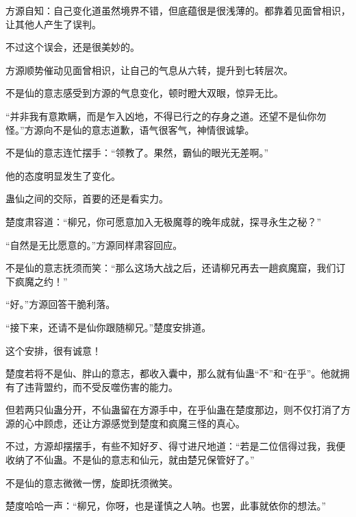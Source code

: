 \begin{this_body}
方源自知：自己变化道虽然境界不错，但底蕴很是很浅薄的。都靠着见面曾相识，让其他人产生了误判。

不过这个误会，还是很美妙的。

方源顺势催动见面曾相识，让自己的气息从六转，提升到七转层次。

不是仙的意志感受到方源的气息变化，顿时瞪大双眼，惊异无比。

“并非我有意欺瞒，而是乍入凶地，不得已行之的存身之道。还望不是仙你勿怪。”方源向不是仙的意志道歉，语气很客气，神情很诚挚。

不是仙的意志连忙摆手：“领教了。果然，霸仙的眼光无差啊。”

他的态度明显发生了变化。

蛊仙之间的交际，首要的还是看实力。

楚度肃容道：“柳兄，你可愿意加入无极魔尊的晚年成就，探寻永生之秘？”

“自然是无比愿意的。”方源同样肃容回应。

不是仙的意志抚须而笑：“那么这场大战之后，还请柳兄再去一趟疯魔窟，我们订下疯魔之约！”

“好。”方源回答干脆利落。

“接下来，还请不是仙你跟随柳兄。”楚度安排道。

这个安排，很有诚意！

楚度若将不是仙、胖山的意志，都收入囊中，那么就有仙蛊“不”和“在乎”。他就拥有了违背盟约，而不受反噬伤害的能力。

但若两只仙蛊分开，不仙蛊留在方源手中，在乎仙蛊在楚度那边，则不仅打消了方源的心中顾虑，还让方源感觉到楚度和疯魔三怪的真心。

不过，方源却摆摆手，有些不知好歹、得寸进尺地道：“若是二位信得过我，我便收纳了不仙蛊。不是仙的意志和仙元，就由楚兄保管好了。”

不是仙的意志微微一愣，旋即抚须微笑。

楚度哈哈一声：“柳兄，你呀，也是谨慎之人呐。也罢，此事就依你的想法。”

\end{this_body}

